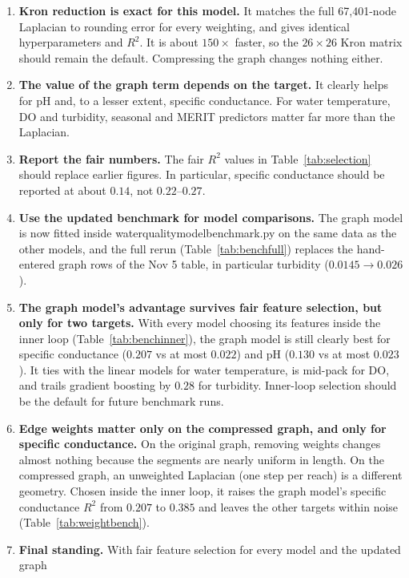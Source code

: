 \documentclass[11pt]{article}
\newcommand{\codeus}{\textunderscore\allowbreak}
\newcommand{\code}[1]{{\ttfamily\let\_\codeus #1}}
\begin{document}
\begin{enumerate}
  \item \textbf{Kron reduction is exact for this model.} It matches the full 67{,}401-node
        Laplacian to rounding error for every weighting, and gives identical hyperparameters and
        $R^2$. It is about $150\times$ faster, so the $26\times26$ Kron matrix should remain
        the default. Compressing the graph changes nothing either.
  \item \textbf{The value of the graph term depends on the target.} It clearly helps for pH and,
        to a lesser extent, specific conductance. For water temperature, DO and turbidity,
        seasonal and MERIT predictors matter far more than the Laplacian.
  \item \textbf{Report the fair numbers.} The fair $R^2$ values in Table~\ref{tab:selection}
        should replace earlier figures. In particular, specific conductance should be reported at
        about $0.14$, not $0.22$--$0.27$.
  \item \textbf{Use the updated benchmark for model comparisons.} The graph model is now fitted
        inside \code{water\_quality\_model\_benchmark.py} on the same data as the other models, and
        the full rerun (Table~\ref{tab:benchfull}) replaces the hand-entered graph rows of the
        Nov 5 table, in particular turbidity ($0.0145 \to 0.026$).
  \item \textbf{The graph model's advantage survives fair feature selection, but only for two
        targets.} With every model choosing its features inside the inner loop
        (Table~\ref{tab:benchinner}), the graph model is still clearly best for specific conductance
        ($0.207$ vs at most $0.022$) and pH ($0.130$ vs at most $0.023$). It ties with the linear models
        for water temperature, is mid-pack for DO, and trails gradient boosting by $0.28$ for turbidity.
        Inner-loop selection should be the default for future benchmark runs.
  \item \textbf{Edge weights matter only on the compressed graph, and only for specific
        conductance.} On the original graph, removing weights changes almost nothing because the
        segments are nearly uniform in length. On the compressed graph, an unweighted Laplacian
        (one step per reach) is a different geometry. Chosen inside the inner loop, it raises the
        graph model's specific conductance $R^2$ from $0.207$ to $0.385$ and leaves the other
        targets within noise (Table~\ref{tab:weightbench}).
  \item \textbf{Final standing.} With fair feature selection for every model and the updated graph

\end{enumerate}
\end{document}
